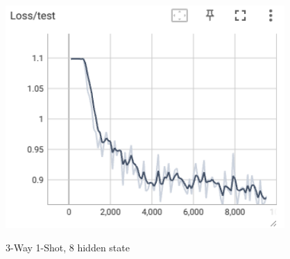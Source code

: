 \documentclass[12pt]{article}
\begin{document}
\begin{enumerate}[label=\alph*]
\begin{figure}[htbp]
\begin{minipage}{0.4\linewidth}
		\includegraphics[width=0.9\linewidth]{./figures/3w1s8_test_loss.png}
		\label{pic three}%
	\end{minipage}
    \caption{3-Way 1-Shot, 8 hidden state}
    \label{3w1s8}
    \end{figure}


\end{enumerate}
\end{document}
